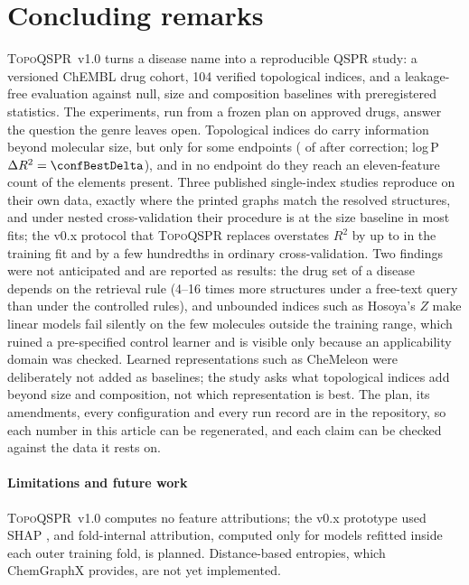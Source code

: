 \documentclass[preprint,12pt]{elsarticle}
\newcommand{\ml}{\textsc{TopoQSPR}}
\begin{document}
\section{Concluding remarks}
\ml{}~v1.0 turns a disease name into a reproducible QSPR study: a versioned ChEMBL drug cohort, 104 verified topological indices, and a leakage-free evaluation against null, size and composition baselines with preregistered statistics. The experiments, run from a frozen plan on \nMolecules{} approved drugs, answer the question the genre leaves open. Topological indices do carry information beyond molecular size, but only for some endpoints (\confNInformative{} of \confNTargets{} after correction; log\,P $\Delta R^2=\confBestDelta$), and in no endpoint do they reach an eleven-feature count of the elements present. Three published single-index studies reproduce on their own data, exactly where the printed graphs match the resolved structures, and under nested cross-validation their procedure is at the size baseline in most fits; the v0.x protocol that \ml{} replaces overstates $R^2$ by up to \expCmaxBtrain{} in the training fit and by a few hundredths in ordinary cross-validation. Two findings were not anticipated and are reported as results: the drug set of a disease depends on the retrieval rule (4--16 times more structures under a free-text query than under the controlled rules), and unbounded indices such as Hosoya's $Z$ make linear models fail silently on the few molecules outside the training range, which ruined a pre-specified control learner and is visible only because an applicability domain was checked. Learned representations such as CheMeleon \cite{burns2026deep} were deliberately not added as baselines; the study asks what topological indices add beyond size and composition, not which representation is best. The plan, its amendments, every configuration and every run record are in the repository, so each number in this article can be regenerated, and each claim can be checked against the data it rests on.

\paragraph{Limitations and future work} \ml{}~v1.0 computes no feature attributions; the v0.x prototype used SHAP \cite{lundberg2017}, and fold-internal attribution, computed only for models refitted inside each outer training fold, is planned. Distance-based entropies, which ChemGraphX provides, are not yet implemented.
\end{document}
